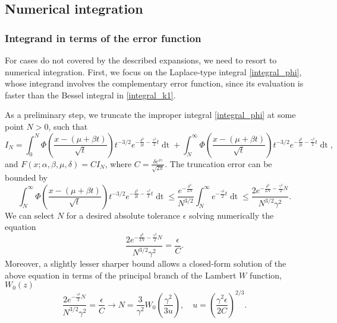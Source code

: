 \documentclass[10pt,a4paper,oneside]{article}
\numberwithin{equation}{section}
\begin{document}
\subsection{Numerical integration}\label{section_numerical_integration}
\subsubsection{Integrand in terms of the error function}

For cases do not covered by the described expansions, we need to resort to numerical integration. First, we focus on the Laplace-type integral \eqref{integral_phi}, whose integrand involves the complementary error function, since its evaluation is faster than the Bessel integral in \eqref{integral_k1}.

As a preliminary step, we truncate the improper integral \eqref{integral_phi} at some point $N > 0$, such that
\begin{equation}\label{truncated_integral}
I_N = \int_0^N \Phi\left(\frac{x - (\mu +\beta t)}{\sqrt{t}}\right) t^{-3/2} e^{-\frac{\delta^2}{2t} - \frac{\gamma^2}{2}t} \mathop{dt} + \int_N^{\infty} \Phi\left(\frac{x - (\mu +\beta t)}{\sqrt{t}}\right) t^{-3/2} e^{-\frac{\delta^2}{2t} - \frac{\gamma^2}{2}t} \mathop{dt},
\end{equation}
and $F(x; \alpha, \beta, \mu, \delta) = C I_N$, where $C = \frac{\delta e^{\delta \gamma}}{\sqrt{2\pi}}$. The truncation error can be bounded by
\begin{equation}
\int_N^{\infty} \Phi\left(\frac{x - (\mu +\beta t)}{\sqrt{t}}\right) t^{-3/2} e^{-\frac{\delta^2}{2t} - \frac{\gamma^2}{2}t} \mathop{dt} \le \frac{e^{-\frac{\delta^2}{2N}}}{N^{3/2}}\int_N^{\infty} e^{- \frac{\gamma^2}{2}t} \mathop{dt} \le \frac{2 e^{-\frac{\delta^2}{2N} - \frac{\gamma^2}{2}N}}{N^{3/2} \gamma^2}.
\end{equation}
We can select $N$ for a desired absolute tolerance $\epsilon$ solving numerically the equation
\begin{equation}
\frac{2 e^{-\frac{\delta^2}{2N} - \frac{\gamma^2}{2}N}}{N^{3/2} \gamma^2} = \frac{\epsilon}{C}.
\end{equation}
Moreover, a slightly lesser sharper bound allows a closed-form solution of the above equation in terms of the principal branch of the Lambert $W$ function, $W_0(z)$
\begin{equation}\label{N_equation}
\frac{2 e^{- \frac{\gamma^2}{2}N}}{N^{3/2} \gamma^2} = \frac{\epsilon}{C} \longrightarrow N = \frac{3}{\gamma^2}W_0\left(\frac{\gamma^2}{3u}\right), \quad u = \left(\frac{\gamma^2 \epsilon}{2 C}\right)^{2/3}.
\end{equation}
\end{document}

